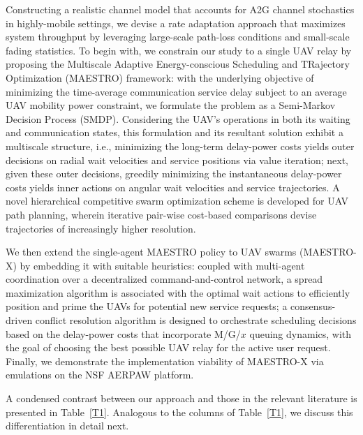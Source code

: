 \documentclass[12pt, draftcls, onecolumn]{IEEEtran}
\theoremstyle{plain}
\theoremstyle{definition}
\theoremstyle{remark}
\begin{document}
Constructing a realistic channel model that accounts for A2G channel stochastics in highly-mobile settings, we devise a rate adaptation approach that maximizes system throughput by leveraging large-scale path-loss conditions and small-scale fading statistics. To begin with, we constrain our study to a single UAV relay by proposing the Multiscale Adaptive Energy-conscious Scheduling and TRajectory Optimization (MAESTRO) framework:  with the underlying objective of minimizing the time-average communication service delay subject to an average UAV mobility power constraint, we formulate the problem as a Semi-Markov Decision Process (SMDP). Considering the UAV's operations in both its waiting and communication states, this formulation and its resultant solution exhibit a multiscale structure, i.e., minimizing the long-term delay-power costs yields outer decisions on radial wait velocities and service positions via value iteration; next, given these outer decisions, greedily minimizing the instantaneous delay-power costs yields inner actions on angular wait velocities and service trajectories. A novel hierarchical competitive swarm optimization scheme is developed for UAV path planning, wherein iterative pair-wise cost-based comparisons devise trajectories of increasingly higher resolution. 

We then extend the single-agent MAESTRO policy to UAV swarms (MAESTRO-X) by embedding it with suitable heuristics: coupled with multi-agent coordination over a decentralized command-and-control network, a spread maximization algorithm is associated with the optimal wait actions to efficiently position and prime the UAVs for potential new service requests; a consensus-driven conflict resolution algorithm is designed to orchestrate scheduling decisions based on the delay-power costs that incorporate M/G/$x$ queuing dynamics, with the goal of choosing the best possible UAV relay for the active user request. Finally, we demonstrate the implementation viability of MAESTRO-X via emulations on the NSF AERPAW platform. 

A condensed contrast between our approach and those in the relevant literature is presented in Table~\ref{T1}. Analogous to the columns of Table~\ref{T1}, we discuss this differentiation in detail next.
\end{document}

